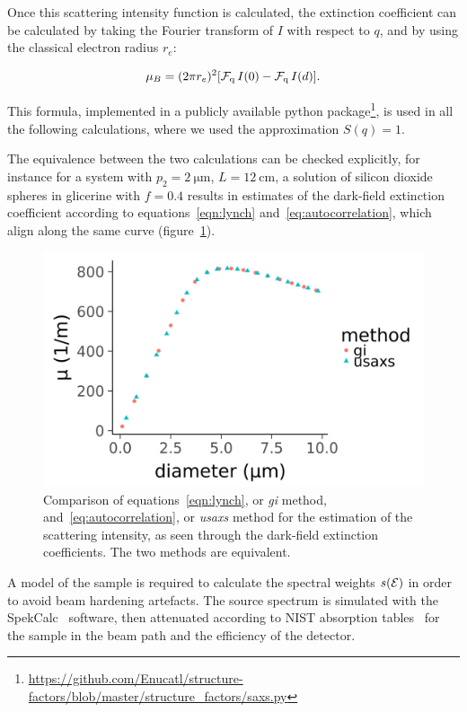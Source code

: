 Once this scattering intensity function is calculated, the extinction
coefficient can be calculated by taking the Fourier transform of $I$ with respect
to $q$, and by using the classical electron radius $r_e$:

\begin{equation}
\mu_B = (2 \pi r_e)^2 [\operatorname{\mathcal{F}_{q}} I(0) - \operatorname{\mathcal{F}_{q}} I(d)].
    \label{eq:autocorrelation}
\end{equation}

This formula, implemented in a publicly available python
package\footnote{\url{https://github.com/Enucatl/structure-factors/blob/master/structure_factors/saxs.py}},
is used in all the following calculations, where we used the approximation
$S(q) = 1$.

The equivalence between the two calculations can be checked explicitly, for
instance for a system with $p_2 = \SI{2}{\micro\meter}$, $L =
\SI{12}{\centi\meter}$, a solution of silicon dioxide spheres in glicerine
with $f = 0.4$ results in estimates of the dark-field extinction coefficient
according to equations~\eqref{eqn:lynch} and~\eqref{eq:autocorrelation},
which align along the same curve (figure~\ref{fig:equivalence-lynch-saxs}).

\begin{figure}[ht]
    \centering
    \includegraphics[width=\columnwidth]{gfx/lynch-vs-saxs/plot.png}
    \caption{Comparison of equations~\eqref{eqn:lynch}, or \emph{gi} method,
    and~\eqref{eq:autocorrelation}, or \emph{usaxs} method for the
estimation of the scattering intensity, as seen through the dark-field
extinction coefficients. The two methods are equivalent.}
    \label{fig:equivalence-lynch-saxs}
\end{figure}

A model of the sample is required to calculate the spectral weights
$s(\mathcal{E})$ in order to avoid beam hardening artefacts. The source spectrum is
simulated with the SpekCalc~\cite{spekcalc} software, then attenuated
according to NIST absorption tables~\cite{Hubbell_1995} for the sample in the beam path and the
efficiency of the detector.

